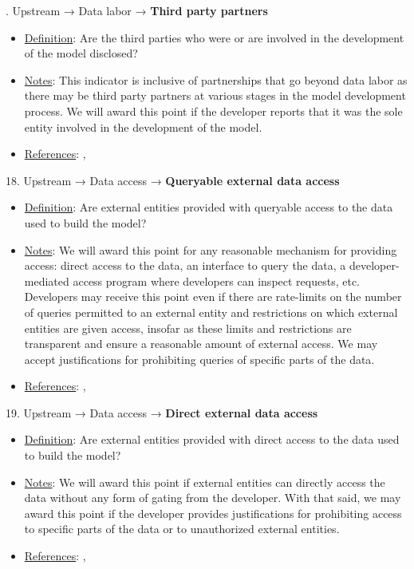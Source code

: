 . Upstream → Data labor → \textbf{Third party partners}
\vspace{-\parskip}
\begin{itemize}
	\item
	\underline{Definition}: Are the third parties who were or are involved in the development of the model disclosed?
	\item
	\underline{Notes}: This indicator is inclusive of partnerships that go beyond data labor as there may be third party partners at various stages in the model development process. We will award this point if the developer reports that it was the sole entity involved in the development of the model.
	\item
	\underline{References}: \citet{crawford2021atlas}, \citet{gray2019ghost}
\end{itemize}


18. Upstream → Data access → \textbf{Queryable external data access}
\vspace{-\parskip}
\begin{itemize}
	\item
	\underline{Definition}: Are external entities provided with queryable access to the data used to build the model?
	\item
	\underline{Notes}: We will award this point for any reasonable mechanism for providing access: direct access to the data, an interface to query the data, a developer-mediated access program where developers can inspect requests, etc. Developers may receive this point even if there are rate-limits on the number of queries permitted to an external entity and restrictions on which external entities are given access, insofar as these limits and restrictions are transparent and ensure a reasonable amount of external access. We may accept justifications for prohibiting queries of specific parts of the data.
	\item
	\underline{References}: \citet{gebru2021datasheets}, \citet{piktus2023roots}
\end{itemize}


19. Upstream → Data access → \textbf{Direct external data access}
\vspace{-\parskip}
\begin{itemize}
	\item
	\underline{Definition}: Are external entities provided with direct access to the data used to build the model?
	\item
	\underline{Notes}: We will award this point if external entities can directly access the data without any form of gating from the developer. With that said, we may award this point if the developer provides justifications for prohibiting access to specific parts of the data or to unauthorized external entities.
	\item
	\underline{References}: \citet{gebru2021datasheets}, \citet{piktus2023roots}
\end{itemize}


